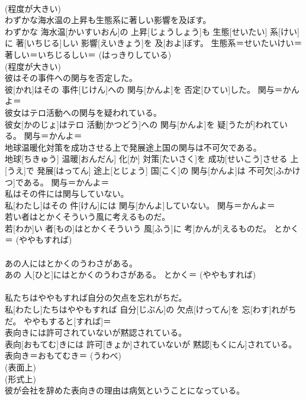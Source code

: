 \documentclass[8pt]{extreport}
\begin{document}
\begin{CJK}{UTF8}{min}
{\\	(程度が大きい) 
\\	わずかな海水温の上昇も生態系に著しい影響を及ぼす。	
\\	わずかな 海水温[かいすいおん]の 上昇[じょうしょう]も 生態[せいたい] 系[けい]に 著[いちじる]しい 影響[えいきょう]を 及[およ]ぼす。	生態系＝せいたいけい＝ 
\\	著しい＝いちじるしい＝ (はっきりしている) 
\\	(程度が大きい) 
\\	彼はその事件への関与を否定した。	
\\	彼[かれ]はその 事件[じけん]への 関与[かんよ]を 否定[ひてい]した。	関与＝かんよ＝ 
\\	彼女はテロ活動への関与を疑われている。	
\\	彼女[かのじょ]はテロ 活動[かつどう]への 関与[かんよ]を 疑[うたが]われている。	関与＝かんよ＝ 
\\	地球温暖化対策を成功させる上で発展途上国の関与は不可欠である。	
\\	地球[ちきゅう] 温暖[おんだん] 化[か] 対策[たいさく]を 成功[せいこう]させる 上[うえ]で 発展[はってん] 途上[とじょう] 国[こく]の 関与[かんよ]は 不可欠[ふかけつ]である。	関与＝かんよ＝ 
\\	私はその件には関与していない。	
\\	私[わたし]はその 件[けん]には 関与[かんよ]していない。	関与＝かんよ＝ 
\\	若い者はとかくそういう風に考えるものだ。	
\\	若[わか]い 者[もの]はとかくそういう 風[ふう]に 考[かんが]えるものだ。	とかく＝ (ややもすれば) 
\\	[(よくないことを)あれこれ] 
\\	あの人にはとかくのうわさがある。	
\\	あの 人[ひと]にはとかくのうわさがある。	とかく＝ (ややもすれば) 
\\	[(よくないことを)あれこれ] 
\\	私たちはややもすれば自分の欠点を忘れがちだ。	
\\	私[わたし]たちはややもすれば 自分[じぶん]の 欠点[けってん]を 忘[わす]れがちだ。	ややもすると[すれば]＝ 
\\	表向きには許可されていないが黙認されている。	
\\	表向[おもてむ]きには 許可[きょか]されていないが 黙認[もくにん]されている。	表向き＝おもてむき＝ (うわべ) 
\\	(表面上) 
\\	(形式上) 
\\	彼が会社を辞めた表向きの理由は病気ということになっている。	
}
\end{CJK}
\end{document}

